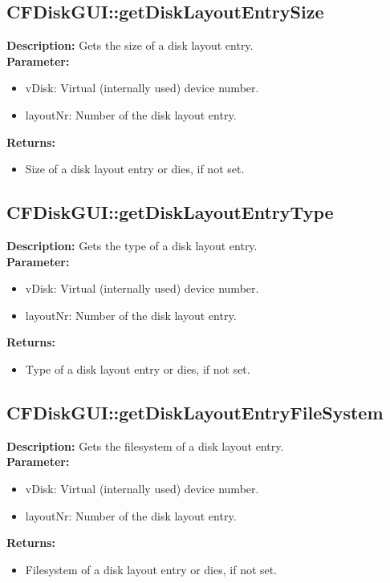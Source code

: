 \subsection{CFDiskGUI::getDiskLayoutEntrySize}
\textbf{Description:} Gets the size of a disk layout entry.\\
\textbf{Parameter:}
\begin{itemize}
\item vDisk: Virtual (internally used) device number.
\item layoutNr: Number of the disk layout entry.
\end{itemize}
\textbf{Returns:}
\begin{itemize}
\item Size of a disk layout entry or dies, if not set.
\end{itemize}

\subsection{CFDiskGUI::getDiskLayoutEntryType}
\textbf{Description:} Gets the type of a disk layout entry.\\
\textbf{Parameter:}
\begin{itemize}
\item vDisk: Virtual (internally used) device number.
\item layoutNr: Number of the disk layout entry.
\end{itemize}
\textbf{Returns:}
\begin{itemize}
\item Type of a disk layout entry or dies, if not set.
\end{itemize}

\subsection{CFDiskGUI::getDiskLayoutEntryFileSystem}
\textbf{Description:} Gets the filesystem of a disk layout entry.\\
\textbf{Parameter:}
\begin{itemize}
\item vDisk: Virtual (internally used) device number.
\item layoutNr: Number of the disk layout entry.
\end{itemize}
\textbf{Returns:}
\begin{itemize}
\item Filesystem of a disk layout entry or dies, if not set.
\end{itemize}

